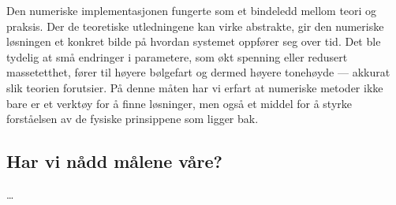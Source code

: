 Den numeriske implementasjonen fungerte som et bindeledd mellom teori og praksis. Der de teoretiske utledningene kan virke abstrakte, gir den numeriske løsningen et konkret bilde på hvordan systemet oppfører seg over tid. Det ble tydelig at små endringer i parametere, som økt spenning eller redusert massetetthet, fører til høyere bølgefart og dermed høyere tonehøyde — akkurat slik teorien forutsier. På denne måten har vi erfart at numeriske metoder ikke bare er et verktøy for å finne løsninger, men også et middel for å styrke forståelsen av de fysiske prinsippene som ligger bak.

\subsection{Har vi nådd målene våre?}
\dots

